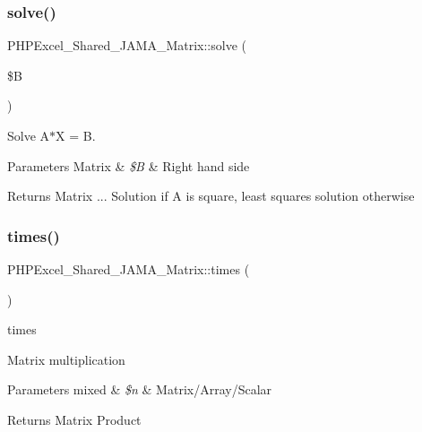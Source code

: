 \subsubsection{\texorpdfstring{solve()}{solve()}}
{\footnotesize\ttfamily P\+H\+P\+Excel\+\_\+\+Shared\+\_\+\+J\+A\+M\+A\+\_\+\+Matrix\+::solve (\begin{DoxyParamCaption}\item[{}]{\$B }\end{DoxyParamCaption})}

Solve A$\ast$X = B.


\begin{DoxyParams}[1]{Parameters}
Matrix & {\em \$B} & Right hand side \\
\hline
\end{DoxyParams}
\begin{DoxyReturn}{Returns}
Matrix ... Solution if A is square, least squares solution otherwise 
\end{DoxyReturn}
\mbox{\label{classPHPExcel__Shared__JAMA__Matrix_a3f7420016614b7ed6ac73c172a5c50ec}} 
\subsubsection{\texorpdfstring{times()}{times()}}
{\footnotesize\ttfamily P\+H\+P\+Excel\+\_\+\+Shared\+\_\+\+J\+A\+M\+A\+\_\+\+Matrix\+::times (\begin{DoxyParamCaption}{ }\end{DoxyParamCaption})}

times

Matrix multiplication 
\begin{DoxyParams}[1]{Parameters}
mixed & {\em \$n} & Matrix/\+Array/\+Scalar \\
\hline
\end{DoxyParams}
\begin{DoxyReturn}{Returns}
Matrix Product 
\end{DoxyReturn}
\mbox{\label{classPHPExcel__Shared__JAMA__Matrix_a81a6a4d8c36abe7e5c807347f5f9db27}} 
